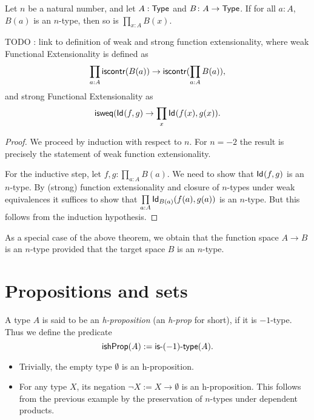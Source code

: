 \begin{thm}\label{thm:hlevel_prod}
 Let $n$ be a natural number, and let $A : \type$ and $B \colon A \to \type$.
     If for all $a : A$, $B(a)$ is an $n$-type, then so is $\prod\limits_{x : A} B(x)$.
\end{thm}

TODO : link to definition of weak and strong function extensionality, where
weak Functional Extensionality is defined as
\[ \prod_{a : A} \iscontr (B(a)) \to \iscontr (\prod_{a : A} B(a)), \]
and strong Functional Extensionality as
\[ \isweq (\idtype{f}{g} \to \prod_x \idtype{f(x)}{g(x)}. \]

\begin{proof}
 We proceed by induction with respect to $n$. For $n = -2$ the result is precisely the statement of weak function extensionality.

 For the inductive step, let $f, g : \prod\limits_{a:A}B(a)$. We need to show that
      $\idtype{f}{g}$ is an $n$-type. By (strong) function extensionality and closure of $n$-types
      under weak equivalences it suffices to show that
      $\prod\limits_{a : A} \idtype[B(a)]{f(a)}{g(a)}$ is an $n$-type. But this follows from the
      induction hypothesis.
\end{proof}

\noindent
As a special case of the above theorem, we obtain that the function space $A \to B$ is an $n$-type
provided that the target space $B$ is an $n$-type.

\section{Propositions and sets}

\begin{defn}
 A type $A$ is said to be an \emph{h-proposition} (an \emph{h-prop} for short), if it is $-1$-type.
  Thus we define the predicate
 \[\ishProp (A) := \istype{(-1)}(A)  .\]
\end{defn}

\begin{egs}
 \begin{itemize}
  \item Trivially, the empty type $\emptyset$ is an h-proposition.
  \item For any type $X$, its negation $\neg X := X \to \emptyset$ is an h-proposition. This follows from the previous example by the preservation of $n$-types under dependent products.
 \end{itemize}
\end{egs}

